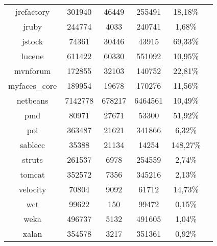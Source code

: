 \begin{table}
\begin{tabularx}{\textwidth}{c|c|c|c|c|c}
		jrefactory & 301940 & 46449 & 255491 & 18,18\%  & \\
		jruby & 244774 & 4033 & 240741 & 1,68\%  & \\
		jstock & 74361 & 30446 & 43915 & 69,33\%  & \\
		lucene & 611422 & 60330 & 551092 & 10,95\%  & \\
		mvnforum & 172855 & 32103 & 140752 & 22,81\%  & \\
		myfaces\_core & 189954 & 19678 & 170276 & 11,56\%  & \\
		netbeans & 7142778 & 678217 & 6464561 & 10,49\%  & \\
		pmd & 80971 & 27671 & 53300 & 51,92\%  & \\
		poi & 363487 & 21621 & 341866 & 6,32\%  & \\
		sablecc & 35388 & 21134 & 14254 & 148,27\%  & \\
		struts & 261537 & 6978 & 254559 & 2,74\%  & \\
		tomcat & 352572 & 7356 & 345216 & 2,13\%  & \\
		velocity & 70804 & 9092 & 61712 & 14,73\%  & \\
		wct & 99622 & 150 & 99472 & 0,15\%  & \\
		weka & 496737 & 5132 & 491605 & 1,04\%  & \\
		xalan & 354578 & 3217 & 351361 & 0,92\%  & \\
	\end{tabularx}
\end{table}
\setlength{\extrarowheight}{0em}